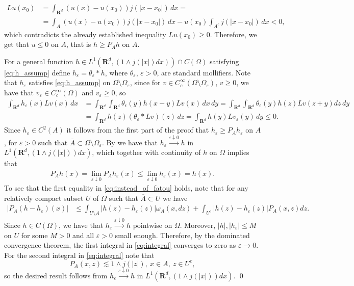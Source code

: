 \documentclass[a4paper,12pt,draft]{article}
\theoremstyle{plain}
\theoremstyle{definition}
\numberwithin{equation}{section}
\newcommand{\rd}{\mathbf{R}^d}
\newcommand\R{\mathbf{R}}
\renewcommand{\le}{\leqslant}
\renewcommand{\ge}{\geqslant}
\newcommand{\1}{1}
\begin{document}
\begin{align*}
Lu(x_0)&=\int_{\R^d}(u(x)-u(x_0))j(|x-x_0|)\, dx=\\
&=\int_{A}(u(x)-u(x_0))j(|x-x_0|)\, dx-u(x_0)\int_{A^c}j(|x-x_0|)\, dx <0,
\end{align*}   
which contradicts the already established inequality $Lu(x_0)\ge 0$. Therefore, we get that $u\le 0$ on $A$, that is $h\ge P_Ah$ on $A$.  

For a general function $h\in L^1(\R^d, (1\wedge j(|x|)dx))\cap C(\Omega)$ satisfying \eqref{eq:h_assump} define $h_\varepsilon=\theta_\varepsilon\ast h$, where $\theta_\varepsilon$, $\varepsilon>0$, are standard mollifiers. Note that $h_\varepsilon$ satisfies \eqref{eq:h_assump} on $\Omega\setminus\Omega_\varepsilon$, since for $v\in C_c^\infty(\Omega\setminus\Omega_\varepsilon)$, $v\ge 0$, we have that $v_\varepsilon\in C_c^\infty(\Omega)$ and $v_\varepsilon\ge 0$, so 
\begin{align*}
\int_{\R^d} h_\varepsilon(x) L v(x)\, dx&= \int_{\rd} \int_{\rd} \theta_{\epsilon}(y) h(x-y) Lv(x) \, dx \, dy= \int_{\rd}   \int_{\rd} \theta_{\epsilon}(y)h(z) Lv(z+y) dz \, dy\\
&=\int_{\R^d} h(z) (\theta_\varepsilon\ast L v)(z)\, dz=\int_{\R^d} h(y) L v_\varepsilon(y)\, dy \le 0.
\end{align*}
Since $h_\varepsilon\in C^2(A)$ it follows from the first part of the proof that $h_\varepsilon\ge P_Ah_\varepsilon$ on $A$, for $\varepsilon>0$ such that $\overline{A}\subset \Omega\setminus\Omega_\varepsilon$. By \cite[Lemma 2.9]{GKL} we have that $h_\varepsilon\xrightarrow{\varepsilon\downarrow 0}h$ in $L^1(\R^d, (1\wedge j(|x|))dx)$, which together with continuity of $h$ on $\Omega$ implies that
\begin{align}\label{eq:instead_of_fatou}
P_A h(x)=\lim_{\varepsilon\downarrow 0} P_A h_\varepsilon(x)\le \lim_{\varepsilon\downarrow 0} h_\varepsilon(x)= h(x).
\end{align} 
To see that the first equality in \eqref{eq:instead_of_fatou} holds, note that for any relatively compact subset $U$ of $\Omega$ such that $\overline{A}\subset U$ we have 
\begin{align}\label{eq:integral}
   |P_A(h-h_\varepsilon)(x)|&\le \int_{U\setminus A}|h(z)-h_\varepsilon(z)|\omega_A(x,dz)+\int_{U^c}|h(z)-h_\varepsilon(z)|P_A(x,z)dz.    
\end{align}
Since $h\in C(\Omega)$, we have that $h_\varepsilon\xrightarrow{\varepsilon\downarrow 0}h$ pointwise on $\Omega$. Moreover, $|h|, |h_\varepsilon|\le M$ on $U$ for some $M>0$ and all $\varepsilon>0$ small enough. Therefore, by the dominated convergence theorem, the first integral in \eqref{eq:integral} converges to zero as $\varepsilon\to 0$. For the second integral in \eqref{eq:integral} note that
\begin{equation*}
P_A(x,z)\lesssim 1\wedge j(|z|), \ x\in A,\  z\in U^c,
\end{equation*}
so the desired result follows from $h_\varepsilon\xrightarrow{\varepsilon\downarrow 0}h$ in $L^1(\R^d, (1\wedge j(|x|))dx)$.
\qed
\end{document}
